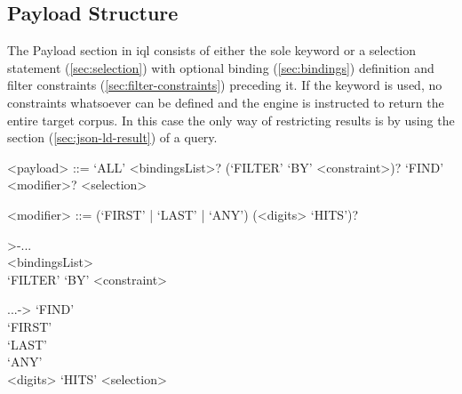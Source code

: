 \documentclass[11pt,a4paper]{article}
\begin{document}
\subsection{Payload Structure}
\label{sec:payload-structure}

The Payload section in \ac{iql} consists of either the sole  keyword or a selection statement (\ref{sec:selection}) with optional binding (\ref{sec:bindings}) definition and filter constraints (\ref{sec:filter-constraints}) preceding it.
If the  keyword is used, no constraints whatsoever can be defined and the engine is instructed to return the entire target corpus.
In this case the only way of restricting results is by using the  section (\ref{sec:json-ld-result}) of a query.

\begin{gram}
	\label{gram:payload}
	\begin{grammar}	
		<payload> ::= `ALL' 
		\alt <bindingsList>? (`FILTER' `BY' <constraint>)? `FIND' <modifier>? <selection>
		
		<modifier> ::= (`FIRST' | `LAST' | `ANY') (<digits> `HITS')?	
	\end{grammar}
	\diagsep
	\begin{samepage} %
	\begin{rrfrag}{>-}{...}
		\sst \\ <bindingsList> \est \sst \\ `FILTER' `BY' <constraint> \est 
	\end{rrfrag}
	\newline
	\begin{rrfrag}{...}{->}
		`FIND' \sst \\
			\sst `FIRST' \\ `LAST' \\ `ANY' \est
			\sst \\ <digits> `HITS' \est
		\est <selection>
	\end{rrfrag}
	\end{samepage}
\end{gram}
\end{document}
